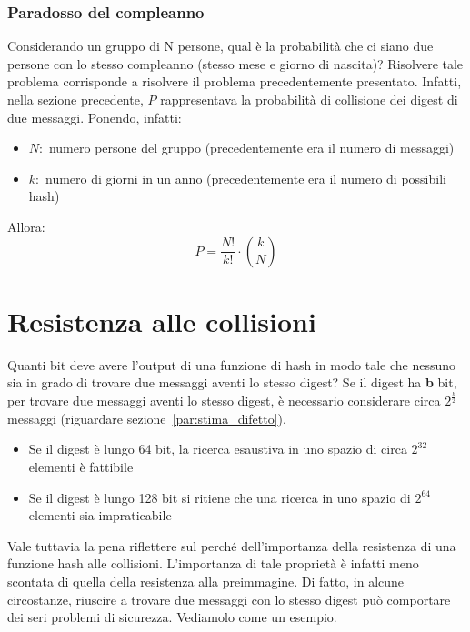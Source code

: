 \subsubsection{Paradosso del compleanno}
Considerando un gruppo di N persone, qual è la probabilità che ci siano due persone con lo stesso compleanno (stesso mese e giorno di nascita)? Risolvere tale problema corrisponde a risolvere il problema precedentemente presentato. Infatti, nella sezione precedente, $P$ rappresentava la probabilità di collisione dei digest di due messaggi. Ponendo, infatti:
\begin{itemize}
\item $N:$ numero persone del gruppo (precedentemente era il numero di messaggi)
\item $k:$ numero di giorni in un anno (precedentemente era il numero di possibili hash)
\end{itemize}
Allora:
\begin{equation}
P = \frac{N!}{k!} \cdot \binom {k}{N}
\end{equation}

\section{Resistenza alle collisioni} \label{par:collisioni}
Quanti bit deve avere l'output di una funzione di hash in modo tale che nessuno sia in grado di trovare due messaggi aventi lo stesso digest? 
\newline \newline
Se il digest ha \textbf{b} bit, per trovare due messaggi aventi lo stesso digest, è necessario considerare circa $2^{\frac{b}{2}}$ messaggi (riguardare sezione~\ref{par:stima_difetto}). 
\begin{itemize}
\item Se il digest è lungo 64 bit, la ricerca esaustiva in uno spazio di circa $2^{32}$ elementi è fattibile
\item Se il digest è lungo 128 bit si ritiene che una ricerca in uno spazio di $2^{64}$ elementi sia impraticabile
\end{itemize}

Vale tuttavia la pena riflettere sul perché dell'importanza della resistenza di una funzione hash alle collisioni. L'importanza di tale proprietà è infatti meno scontata di quella della resistenza alla preimmagine.
Di fatto, in alcune circostanze, riuscire a trovare due messaggi con lo stesso digest può comportare dei seri problemi di sicurezza. Vediamolo come un esempio.

